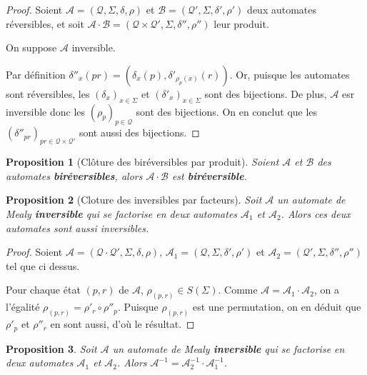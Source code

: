 \documentclass{article}
\newtheorem{prop}{Proposition}
\begin{document}
\begin{proof}
  Soient $\mathcal{A}=\left(\mathcal{Q}, \Sigma, \delta, \rho\right)$ et $\mathcal{B}=\left(\mathcal{Q'}, \Sigma, \delta', \rho'\right)$ deux automates réversibles, et soit $\mathcal{A\cdot B}=\left(\mathcal{Q\times Q'}, \Sigma, \delta'', \rho''\right)$ leur produit.


  On suppose $\mathcal{A}$ inversible.


  Par définition $\delta''_x(pr)=(\delta_x(p), \delta'_{\rho_p(x)}(r))$. Or, puisque les automates sont réversibles, les $(\delta_x)_{x\in\Sigma}$ et ${(\delta'_x)}_{x\in\Sigma}$ sont des bijections. De plus, $\mathcal{A}$ esr inversible donc les ${(\rho_p)}_{p\in \mathcal{Q}}$ sont des bijections. On en conclut que les ${(\delta''_{pr})}_{pr\in\mathcal{Q}\times\mathcal{Q'}}$ sont aussi des bijections.
\end{proof}

\begin{prop}[Clôture des biréversibles par produit]
  Soient $\mathcal{A}$ et $\mathcal{B}$ des automates \textbf{biréversibles}, alors $\mathcal{A}\cdot\mathcal{B}$ est \textbf{biréversible}.
\end{prop}

\begin{prop}[Cloture des inversibles par facteurs]\label{prop_cloture_inv_facteurs}
  Soit $\mathcal{A}$ un automate de Mealy \textbf{inversible} qui se factorise en deux automates $\mathcal{A}_1$ et $\mathcal{A}_2$. Alors ces deux automates sont aussi inversibles.
\end{prop}

\begin{proof}
  Soient $\mathcal{A}=\left(\mathcal{Q\cdot Q'}, \Sigma, \delta, \rho\right)$, $\mathcal{A}_1=\left(\mathcal{Q}, \Sigma, \delta', \rho'\right)$ et $\mathcal{A}_2=\left(\mathcal{Q'}, \Sigma, \delta'', \rho''\right)$ tel que ci dessus.

  Pour chaque état $(p, r)$ de $\mathcal{A}$, $\rho_{(p, r)}\in S(\Sigma)$. Comme $\mathcal{A}=\mathcal{A}_1\cdot\mathcal{A}_2$, on a l'égalité $\rho_{(p, r)}=\rho'_r\circ\rho''_p$. Puisque $\rho_{(p, r)}$ est une permutation, on en déduit que $\rho'_p$ et $\rho''_r$ en sont aussi, d'où le résultat.
\end{proof}

\begin{prop}\label{prop_inverse_produit}
	Soit $\mathcal{A}$ un automate de Mealy \textbf{inversible} qui se factorise en deux automates $\mathcal{A}_1$ et $\mathcal{A}_2$.
	Alors $\mathcal{A}^{-1} = \mathcal{A}_2^{-1} \cdot \mathcal{A}_1^{-1}$.
\end{prop}
\end{document}
